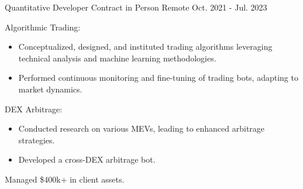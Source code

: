 \begin{cventries}

\cventry
{Quantitative Developer} %
{Contract in Person} %
{Remote} %
{Oct. 2021 - Jul. 2023} %
{ %
\begin{cvitems}
\item {Algorithmic Trading:}
\begin{itemize}
  \item {Conceptualized, designed, and instituted trading algorithms leveraging technical analysis and machine learning methodologies.}
  \item {Performed continuous monitoring and fine-tuning of trading bots, adapting to market dynamics.}
\end{itemize}
\item {DEX Arbitrage:}
\begin{itemize}
  \item {Conducted research on various MEVs, leading to enhanced arbitrage strategies.}
  \item {Developed a cross-DEX arbitrage bot.}
\end{itemize}
\item {Managed \$400k+ in client assets.}
\end{cvitems}
}


\end{cventries}
